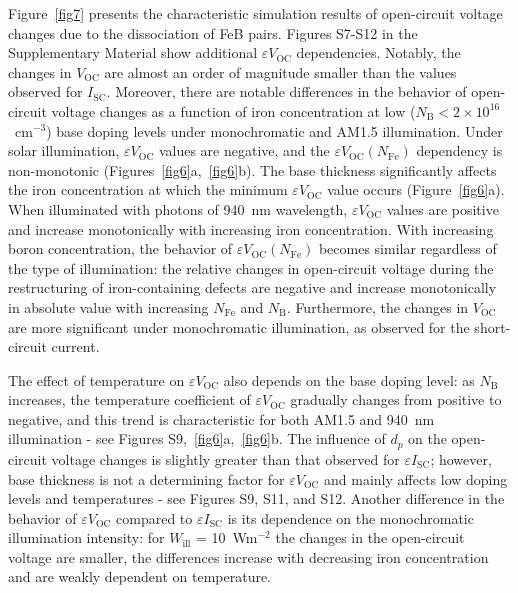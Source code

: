 \documentclass[a4paper,fleqn]{cas-sc}
\begin{document}
Figure~\ref{fig7} presents the characteristic simulation results of open-circuit voltage changes due to the dissociation of FeB pairs. Figures S7-S12 in the Supplementary Material show additional $\varepsilon V_\mathrm{OC}$ dependencies. Notably, the changes in $V_\mathrm{OC}$ are almost an order of magnitude smaller than the values observed for $I_\mathrm{SC}$. Moreover, there are notable differences in the behavior of open-circuit voltage changes as a function of iron concentration at low ($N_\mathrm{B}<2\times10^{16}$~cm$^{-3}$) base doping levels under monochromatic and AM1.5 illumination. Under solar illumination, $\varepsilon V_\mathrm{OC}$ values are negative, and the $\varepsilon V_\mathrm{OC}$$\left(N_\mathrm{Fe}\right)$ dependency is non-monotonic (Figures~\ref{fig6}a,~\ref{fig6}b). The base thickness significantly affects the iron concentration at which the minimum $\varepsilon V_\mathrm{OC}$ value occurs (Figure~\ref{fig6}a). When illuminated with photons of 940~nm wavelength, $\varepsilon V_\mathrm{OC}$ values are positive and increase monotonically with increasing iron concentration. With increasing boron concentration, the behavior of $\varepsilon V_\mathrm{OC}$$\left(N_\mathrm{Fe}\right)$ becomes similar regardless of the type of illumination: the relative changes in open-circuit voltage during the restructuring of iron-containing defects are negative and increase monotonically in absolute value with increasing $N_\mathrm{Fe}$ and $N_\mathrm{B}$. Furthermore, the changes in $V_\mathrm{OC}$ are more significant under monochromatic illumination, as observed for the short-circuit current.

The effect of temperature on $\varepsilon V_\mathrm{OC}$ also depends on the base doping level: as $N_\mathrm{B}$ increases, the temperature coefficient of $\varepsilon V_\mathrm{OC}$ gradually changes from positive to negative, and this trend is characteristic for both AM1.5 and 940~nm illumination - see Figures S9,~\ref{fig6}a,~\ref{fig6}b. The influence of $d_p$ on the open-circuit voltage changes is slightly greater than that observed for $\varepsilon I_\mathrm{SC}$; however, base thickness is not a determining factor for $\varepsilon V_\mathrm{OC}$ and mainly affects low doping levels and temperatures - see Figures S9, S11, and S12. Another difference in the behavior of $\varepsilon V_\mathrm{OC}$ compared to $\varepsilon I_\mathrm{SC}$ is its dependence on the monochromatic illumination intensity: for $W_\mathrm{ill}$ = 10~Wm$^{-2}$ the changes in the open-circuit voltage are smaller, the differences increase with decreasing iron concentration and are weakly dependent on temperature.
\end{document}
